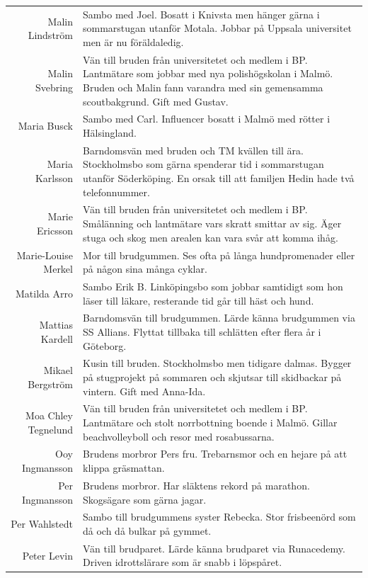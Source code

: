 \documentclass[a5paper]{article}
\begin{document}
\begin{longtable}[l]{N|L}
				Malin Lindström	&	Sambo med Joel. Bosatt i Knivsta men hänger gärna i sommarstugan utanför Motala. Jobbar på Uppsala universitet men är nu föräldaledig.	\\
				Malin Svebring	&	Vän till bruden från universitetet och medlem i BP. Lantmätare som jobbar med nya polishögskolan i Malmö. Bruden och Malin fann varandra med sin gemensamma scoutbakgrund. Gift med Gustav.	\\
				Maria Busck	&	Sambo med Carl. Influencer bosatt i Malmö med rötter i Hälsingland. 	\\
				Maria Karlsson	&	Barndomsvän med bruden och TM kvällen till ära. Stockholmsbo som gärna spenderar tid i sommarstugan utanför Söderköping. En orsak till att familjen Hedin hade två telefonnummer.	\\
				Marie Ericsson	&	Vän till bruden från universitetet och medlem i BP. Smålänning och lantmätare vars skratt smittar av sig. Äger stuga och skog men arealen kan vara svår att komma ihåg.	\\
				Marie-Louise Merkel	&	Mor till brudgummen. Ses ofta på långa hundpromenader eller på någon sina många cyklar.  	\\
				Matilda Arro	&	Sambo Erik B. Linköpingsbo som jobbar samtidigt som hon läser till läkare, resterande tid går till häst och hund. 	\\
				Mattias Kardell	&	Barndomsvän till brudgummen. Lärde känna brudgummen via SS Allians. Flyttat tillbaka till schlätten efter flera år i Göteborg.	\\
				Mikael Bergström	&	Kusin till bruden. Stockholmsbo men tidigare dalmas. Bygger på stugprojekt på sommaren och skjutsar till skidbackar på vintern. Gift med Anna-Ida.	\\
				Moa Chley Tegnelund	&	Vän till bruden från universitetet och medlem i BP. Lantmätare och stolt norrbottning boende i Malmö. Gillar beachvolleyboll och resor med rosabussarna.  	\\
				Ooy Ingmansson	&	Brudens morbror Pers fru. Trebarnsmor och en hejare på att klippa gräsmattan.	\\
				Per Ingmansson	&	Brudens morbror. Har släktens rekord på marathon. Skogsägare som gärna jagar. 	\\
				Per Wahlstedt	&	Sambo till brudgummens syster Rebecka. Stor frisbeenörd som då och då bulkar på gymmet. 	\\
				Peter Levin	&	Vän till brudparet. Lärde känna brudparet via Runacedemy. Driven idrottslärare som är snabb i löpspåret.	\\

\end{longtable}
\end{document}
